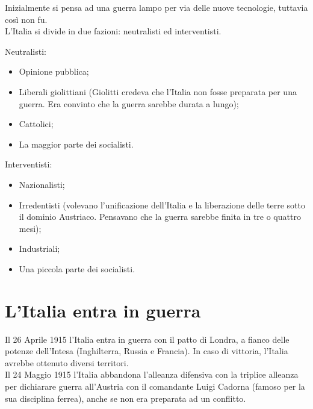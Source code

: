 \documentclass{article}
\begin{document}
Inizialmente si pensa ad una guerra lampo per via delle nuove tecnologie, tuttavia così non fu.\\
\newline
L'Italia si divide in due fazioni: neutralisti ed interventisti.
\newline

Neutralisti:
\begin{itemize}
    \item Opinione pubblica;
    \item Liberali giolittiani (Giolitti credeva che l'Italia non fosse preparata per una guerra. Era convinto che la guerra sarebbe
          durata a lungo);
    \item Cattolici;
    \item La maggior parte dei socialisti.
\end{itemize}

Interventisti:
\begin{itemize}
    \item Nazionalisti;
    \item Irredentisti (volevano l'unificazione dell'Italia e la liberazione delle terre sotto il dominio Austriaco.
          Pensavano che la guerra sarebbe finita in tre o quattro mesi);
    \item Industriali;
    \item Una piccola parte dei socialisti.
\end{itemize}

\section{L'Italia entra in guerra}

Il 26 Aprile 1915 l'Italia entra in guerra con il patto di Londra, a fianco delle potenze dell'Intesa (Inghilterra, Russia e Francia).
In caso di vittoria, l'Italia avrebbe ottenuto diversi territori.\\
Il 24 Maggio 1915 l'Italia abbandona l'alleanza difensiva con la triplice alleanza per dichiarare guerra all'Austria con
il comandante Luigi Cadorna (famoso per la sua disciplina ferrea), anche se non era preparata ad un conflitto.
\end{document}
